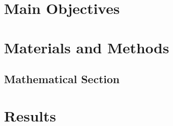 


\section*{Main Objectives}



\section*{Materials and Methods}



\subsection*{Mathematical Section}




\section*{Results}







